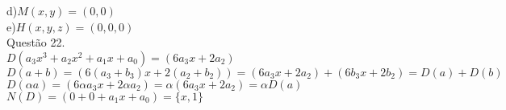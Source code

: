 \documentclass[12pt]{article}
\begin{document}
\noindent d)\quad$M(x,y)=(0,0)$\\

\noindent e)\quad$H(x,y,z)=(0,0,0)$\\

\noindent Questão 22.\\

$D(a_{3}x^{3}+a_{2}x^{2}+a_{1}x+a_{0})=(6a_{3}x+2a_{2})$\\

$D(a+b)=(6(a_{3}+b_{3})x+2(a_{2}+b_{2}))=(6a_{3}x+2a_{2})+(6b_{3}x+2b_{2})=D(a)+D(b)$\\

$D(\alpha a)=(6\alpha a_{3}x+2\alpha a_{2})=\alpha(6a_{3}x+2a_{2})=\alpha D(a)$\\

$N(D)=(0+0+a_{1}x+a_{0})=\lbrace x,1\rbrace$\\
\end{document}
